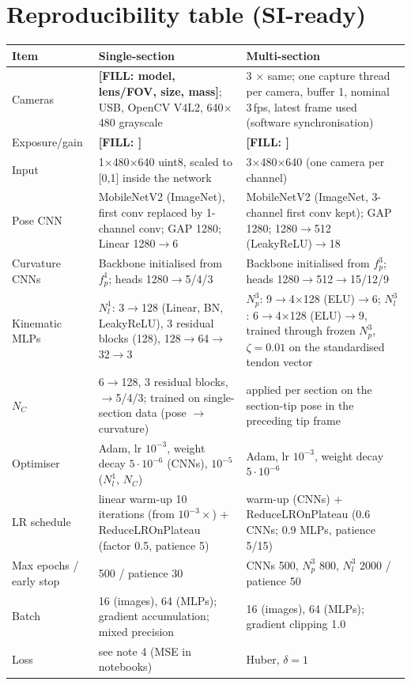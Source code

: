 \documentclass[10pt,a4paper]{article}
\newcommand{\FILL}[1]{\textcolor{orange!85!black}{\textbf{[FILL: #1]}}}
\begin{document}
\section{Reproducibility table (SI-ready)}\label{app:repro}
\scriptsize
\begin{longtable}{p{3.2cm}p{6.6cm}p{6.6cm}}
\toprule
Item & Single-section & Multi-section\\\midrule\endhead
Cameras & \FILL{model, lens/FOV, size, mass}; USB, OpenCV V4L2, 640$\times$480 grayscale & 3 $\times$ same; one capture thread per camera, buffer 1, nominal 3\,fps, latest frame used (software synchronisation)\\
Exposure/gain & \FILL{} & \FILL{}\\
Input & 1$\times$480$\times$640 uint8, scaled to [0,1] inside the network & 3$\times$480$\times$640 (one camera per channel)\\
Pose CNN & MobileNetV2 (ImageNet), first conv replaced by 1-channel conv; GAP 1280; Linear 1280$\to$6 & MobileNetV2 (ImageNet, 3-channel first conv kept); GAP 1280; 1280$\to$512 (LeakyReLU)$\to$18\\
Curvature CNNs & Backbone initialised from $f_p^1$; heads 1280$\to$5/4/3 & Backbone initialised from $f_p^3$; heads 1280$\to$512$\to$15/12/9\\
Kinematic MLPs & $N_l^1$: 3$\to$128 (Linear, BN, LeakyReLU), 3 residual blocks (128), 128$\to$64$\to$32$\to$3 & $N_p^3$: 9$\to$4$\times$128 (ELU)$\to$6; $N_l^3$: 6$\to$4$\times$128 (ELU)$\to$9, trained through frozen $N_p^3$, $\zeta=0.01$ on the standardised tendon vector\\
$N_C$ & 6$\to$128, 3 residual blocks, $\to$5/4/3; trained on single-section data (pose $\to$ curvature) & applied per section on the section-tip pose in the preceding tip frame\\
Optimiser & Adam, lr $10^{-3}$, weight decay $5\cdot10^{-6}$ (CNNs), $10^{-5}$ ($N_l^1$, $N_C$) & Adam, lr $10^{-3}$, weight decay $5\cdot10^{-6}$\\
LR schedule & linear warm-up 10 iterations (from $10^{-3}\times$) + ReduceLROnPlateau (factor 0.5, patience 5) & warm-up (CNNs) + ReduceLROnPlateau (0.6 CNNs; 0.9 MLPs, patience 5/15)\\
Max epochs / early stop & 500 / patience 30 & CNNs 500, $N_p^3$ 800, $N_l^3$ 2000 / patience 50\\
Batch & 16 (images), 64 (MLPs); gradient accumulation; mixed precision & 16 (images), 64 (MLPs); gradient clipping 1.0\\
Loss & see note 4 (MSE in notebooks) & Huber, $\delta=1$\\

\end{longtable}
\end{document}
